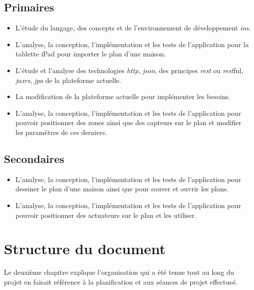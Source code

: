 	\subsection{Primaires}

		\begin{itemize}

			\item L'étude du langage, des concepts et de l'environnement de développement \emph{\gls{ios}}.
			\item L'analyse, la conception, l'implémentation et les tests de l'application pour la tablette iPad pour importer le plan d'une maison.
			\item L'étude et l'analyse des technologies \emph{\gls{http}}, \emph{\gls{json}}, des principes \emph{\gls{rest}} ou \emph{\gls{rest}}ful, \emph{\gls{jaxrs}}, \emph{\gls{jpa}} de la plateforme actuelle.
			\item La modification de la plateforme actuelle pour implémenter les besoins.
			\item L'analyse, la conception, l'implémentation et les tests de l'application pour pouvoir positionner des zones ainsi que des capteurs sur le plan et modifier les paramètres de ces derniers.
		\end{itemize}


	\subsection{Secondaires}

		\begin{itemize}
			\item L'analyse, la conception, l'implémentation et les tests de l'application pour dessiner le plan d'une maison ainsi que pour sauver et ouvrir les plans.
			\item L'analyse, la conception, l'implémentation et les tests de l'application pour pouvoir positionner des actuateurs sur le plan et les utiliser.
		\end{itemize}

\section{Structure du document} %
\label{sec:structure_du_document}

Le deuxième chapitre explique l'organisation qui a été tenue tout au long du projet en faisait référence à la planification et aux séances de projet effectueé.

